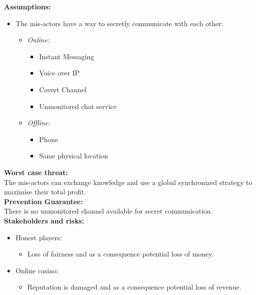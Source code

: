 \documentclass[a4paper,11pt]{report}
\begin{document}
\textbf{Assumptions:}
\begin{itemize}
\item The mis-actors have a way to secretly communicate with each other:
\begin{itemize}
\item \emph{Online:}
\begin{itemize}
\item Instant Messaging
\item Voice over IP
\item Covert Channel
\item Unmonitored chat service
\end{itemize}
\item \emph{Offline:}
\begin{itemize}
\item Phone
\item Same physical location
\end{itemize}
\end{itemize}
\end{itemize}
\textbf{Worst case threat:}\\
The mis-actors can exchange knowledge and use a global synchronized strategy to maximise their total profit. \\
\textbf{Prevention Guarantee:} \\
There is no unmonitored channel available for secret communication. \\
\textbf{Stakeholders and risks:}
\begin{itemize}
\item Honest players:
\begin{itemize}
\item Loss of fairness and as a consequence potential loss of money.
\end{itemize}
\item Online casino:
\begin{itemize}
\item Reputation is damaged and as a consequence potential loss of revenue.
\end{itemize}
\end{itemize}
\end{document}
